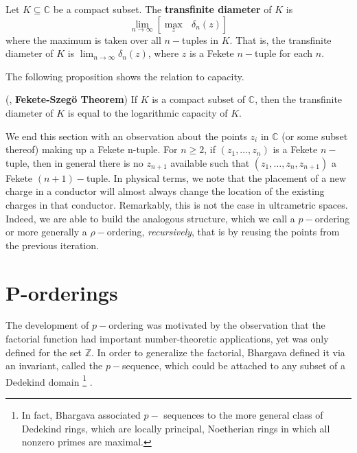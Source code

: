 \begin{definition}
Let $K \subseteq \mathbb{C}$ be a compact subset. The \textbf{transfinite diameter} of $K$ is \[ \lim_{n\to\infty} [ \max_z \text{ } \delta_n(z)]\] where the maximum is taken over all $n-$tuples in $K$. That is, the transfinite diameter of $K$ is $ \lim_{n\to\infty} \delta_n(z)$, where $z$ is a Fekete $n-$tuple for each $n$.
\end{definition}

The following proposition shows the relation to capacity.\\

\begin{proposition}
(\cite{fek}, \textbf{Fekete-Szeg\"o Theorem}) If $K$ is a compact subset of $\mathbb{C}$, then the transfinite diameter of $K$ is equal to the logarithmic capacity of $K$.
\end{proposition}



We end this section with an observation about the points $z_i$ in $\mathbb{C}$ (or some subset thereof) making up a Fekete n-tuple. For $n \geq 2$, if $(z_1,\ldots,z_{n})$ is a Fekete $n-$tuple, then in general there is no $z_{n+1}$ available such that $(z_1,\ldots,z_n, z_{n+1})$ a Fekete $(n+1)-$tuple. In physical terms, we note that the placement of a new charge in a conductor will almost always change the location of the existing charges in that conductor. Remarkably, this is not the case in ultrametric spaces. Indeed, we are able to build the analogous structure, which we call a $p-$ordering or more generally a $\rho-$ordering, \textit{recursively}, that is by reusing the points from the previous iteration.\\ 

\section{P-orderings}

The development of $p-$ordering was motivated by the observation that the factorial function had important number-theoretic applications, yet was only defined for the set $\mathbb{Z}$. In order to generalize the factorial, Bhargava defined it via an invariant, called the $p-$sequence, which could be attached to any subset of a Dedekind domain \footnote{In fact, Bhargava associated $p-$ sequences to the more general class of Dedekind rings, which are locally principal, Noetherian rings in which all nonzero
primes are maximal.}    \cite{mb1}.\\

